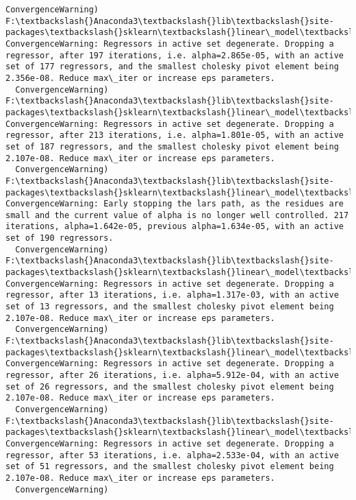 \documentclass[11pt]{article}
\begin{document}
\begin{Verbatim}[commandchars=\\\{\}]
  ConvergenceWarning)
F:\textbackslash{}Anaconda3\textbackslash{}lib\textbackslash{}site-packages\textbackslash{}sklearn\textbackslash{}linear\_model\textbackslash{}least\_angle.py:313: ConvergenceWarning: Regressors in active set degenerate. Dropping a regressor, after 197 iterations, i.e. alpha=2.865e-05, with an active set of 177 regressors, and the smallest cholesky pivot element being 2.356e-08. Reduce max\_iter or increase eps parameters.
  ConvergenceWarning)
F:\textbackslash{}Anaconda3\textbackslash{}lib\textbackslash{}site-packages\textbackslash{}sklearn\textbackslash{}linear\_model\textbackslash{}least\_angle.py:313: ConvergenceWarning: Regressors in active set degenerate. Dropping a regressor, after 213 iterations, i.e. alpha=1.801e-05, with an active set of 187 regressors, and the smallest cholesky pivot element being 2.107e-08. Reduce max\_iter or increase eps parameters.
  ConvergenceWarning)
F:\textbackslash{}Anaconda3\textbackslash{}lib\textbackslash{}site-packages\textbackslash{}sklearn\textbackslash{}linear\_model\textbackslash{}least\_angle.py:339: ConvergenceWarning: Early stopping the lars path, as the residues are small and the current value of alpha is no longer well controlled. 217 iterations, alpha=1.642e-05, previous alpha=1.634e-05, with an active set of 190 regressors.
  ConvergenceWarning)
F:\textbackslash{}Anaconda3\textbackslash{}lib\textbackslash{}site-packages\textbackslash{}sklearn\textbackslash{}linear\_model\textbackslash{}least\_angle.py:313: ConvergenceWarning: Regressors in active set degenerate. Dropping a regressor, after 13 iterations, i.e. alpha=1.317e-03, with an active set of 13 regressors, and the smallest cholesky pivot element being 2.107e-08. Reduce max\_iter or increase eps parameters.
  ConvergenceWarning)
F:\textbackslash{}Anaconda3\textbackslash{}lib\textbackslash{}site-packages\textbackslash{}sklearn\textbackslash{}linear\_model\textbackslash{}least\_angle.py:313: ConvergenceWarning: Regressors in active set degenerate. Dropping a regressor, after 26 iterations, i.e. alpha=5.912e-04, with an active set of 26 regressors, and the smallest cholesky pivot element being 2.107e-08. Reduce max\_iter or increase eps parameters.
  ConvergenceWarning)
F:\textbackslash{}Anaconda3\textbackslash{}lib\textbackslash{}site-packages\textbackslash{}sklearn\textbackslash{}linear\_model\textbackslash{}least\_angle.py:313: ConvergenceWarning: Regressors in active set degenerate. Dropping a regressor, after 53 iterations, i.e. alpha=2.533e-04, with an active set of 51 regressors, and the smallest cholesky pivot element being 2.107e-08. Reduce max\_iter or increase eps parameters.
  ConvergenceWarning)

    \end{Verbatim}
\end{document}
